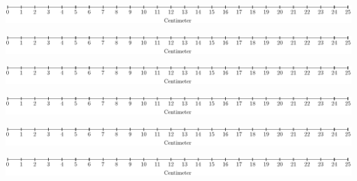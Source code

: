 \documentclass[a4paper,landscape,english]{article}
\begin{document}
\begin{center}
	\includegraphics[]{linjal} \vspace{50pt}
	
	\includegraphics[]{linjal} \vspace{50pt}
	
		\includegraphics[]{linjal} \vspace{50pt}
		
			\includegraphics[]{linjal} \vspace{50pt}
			
				\includegraphics[]{linjal} \vspace{50pt}
				
					\includegraphics[]{linjal} \vspace{50pt}
\end{center}
\end{document}
